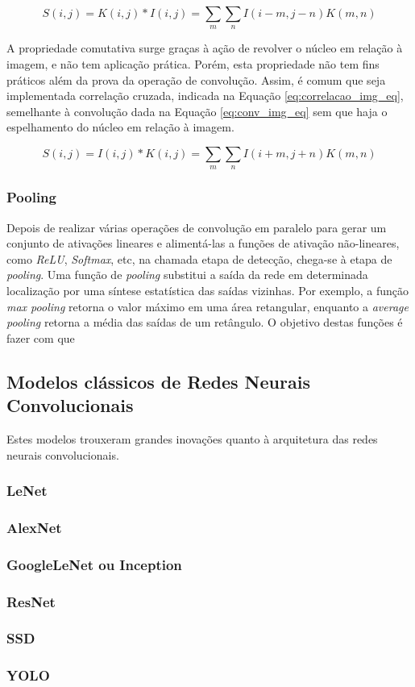 \begin{equation}\label{eq:conv_img_eq}
	S(i,j) = K(i,j)*I(i,j) = \sum_{m}\sum_{n}I(i-m,j-n)K(m,n)
\end{equation}

A propriedade comutativa surge graças à ação de revolver o núcleo em relação à imagem, e não tem aplicação prática. Porém, esta propriedade não tem fins práticos além da prova da operação de convolução. Assim, é comum que seja implementada correlação cruzada, indicada na Equação \ref{eq:correlacao_img_eq}, semelhante à convolução dada na Equação \ref{eq:conv_img_eq} sem que haja o espelhamento do núcleo em relação à imagem.

\begin{equation}\label{eq:correlacao_img_eq}
	S(i,j) = I(i,j)*K(i,j) = \sum_{m}\sum_{n}I(i+m,j+n)K(m,n)
\end{equation}

\subsubsection{Pooling}

Depois de realizar várias operações de convolução em paralelo para gerar um conjunto de ativações lineares e alimentá-las a funções de ativação não-lineares, como \emph{ReLU}, \emph{Softmax}, etc, na chamada etapa de detecção, chega-se à etapa de \emph{pooling}. Uma função de \emph{pooling} substitui a saída da rede em determinada localização por uma síntese estatística das saídas vizinhas. Por exemplo, a função \emph{max pooling} retorna o valor máximo em uma área retangular, enquanto a \emph{average pooling} retorna a média das saídas de um retângulo. O objetivo destas funções é fazer com que


\subsection{Modelos clássicos de Redes Neurais Convolucionais}
Estes modelos trouxeram grandes inovações quanto à arquitetura das redes neurais convolucionais.
\subsubsection{LeNet}

\subsubsection{AlexNet}

\subsubsection{GoogleLeNet ou Inception}

\subsubsection{ResNet}

\subsubsection{SSD}

\subsubsection{YOLO}

